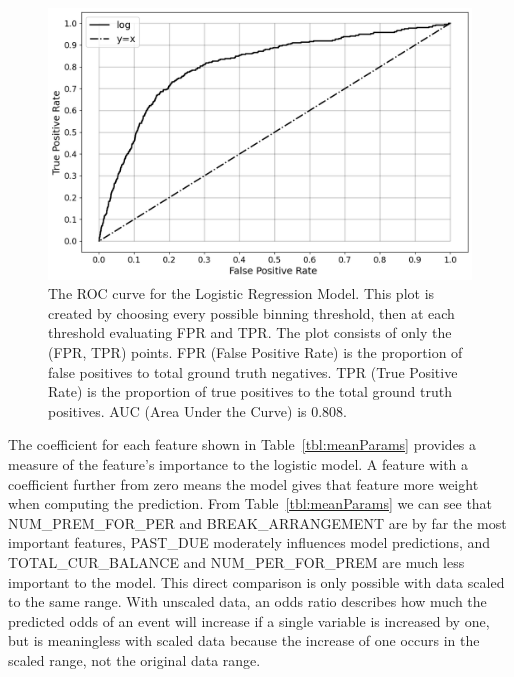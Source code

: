\documentclass[10pt,letterpaper]{article}
\begin{document}
\begin{figure}[htb]
    \centering
    \includegraphics[width=\textwidth]{ROC.png}
    \caption[ROC curve]{The ROC curve for the Logistic Regression Model. This plot is created by choosing every possible binning threshold, then at each threshold evaluating FPR and TPR. The plot consists of only the (FPR, TPR) points. FPR (False Positive Rate) is the proportion of false positives to total ground truth negatives. TPR (True Positive Rate) is the proportion of true positives to the total ground truth positives. AUC (Area Under the Curve) is 0.808.}
    \label{fig:ROC}
\end{figure}

The coefficient for each feature shown in Table~\ref{tbl:meanParams} provides a measure of the feature's importance to the logistic model. A feature with a coefficient further from zero means the model gives that feature more weight when computing the prediction. From Table~\ref{tbl:meanParams} we can see that NUM\_PREM\_FOR\_PER and BREAK\_ARRANGEMENT are by far the most important features, PAST\_DUE moderately influences model predictions, and TOTAL\_CUR\_BALANCE and NUM\_PER\_FOR\_PREM are much less important to the model. This direct comparison is only possible with data scaled to the same range. With unscaled data, an odds ratio describes how much the predicted odds of an event will increase if a single variable is increased by one, but is meaningless with scaled data because the increase of one occurs in the scaled range, not the original data range. 
\end{document}
